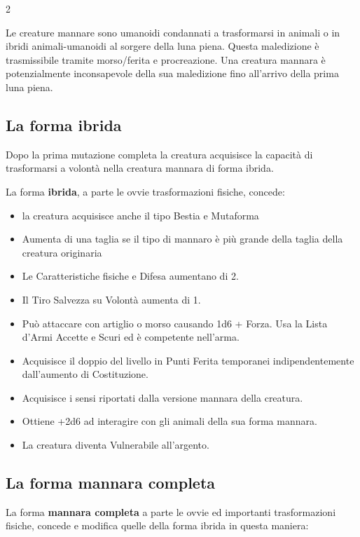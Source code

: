 \begin{multicols}{2}

Le creature mannare sono umanoidi condannati a trasformarsi in animali o in ibridi animali-umanoidi al sorgere della luna piena. Questa maledizione è trasmissibile tramite morso/ferita e procreazione. Una creatura mannara è potenzialmente inconsapevole della sua maledizione fino all'arrivo della prima luna piena.

\subsection{La forma ibrida}

Dopo la prima mutazione completa la creatura acquisisce la capacità di trasformarsi a volontà nella creatura mannara di forma ibrida.

La forma \textbf{ibrida}, a parte le ovvie trasformazioni fisiche, concede:

\begin{itemize}[leftmargin=*] \setlength{\itemsep}{0pt}
	\item la creatura acquisisce anche il tipo Bestia e Mutaforma
	\item Aumenta di una taglia se il tipo di mannaro è più grande della taglia della creatura originaria
	\item Le Caratteristiche fisiche e Difesa aumentano di 2.
	\item Il Tiro Salvezza su Volontà aumenta di 1.
	\item Può attaccare con artiglio o morso causando 1d6 + Forza. Usa la Lista d'Armi Accette e Scuri ed è competente nell'arma.
	\item Acquisisce il doppio del livello in Punti Ferita temporanei indipendentemente dall'aumento di Costituzione.
	\item Acquisisce i sensi riportati dalla versione mannara della creatura.
	\item Ottiene +2d6 ad interagire con gli animali della sua forma mannara.
	\item La creatura diventa Vulnerabile all'argento.
\end{itemize}

\subsection{La forma mannara completa}

La forma \textbf{mannara completa} a parte le ovvie ed importanti trasformazioni fisiche, concede e modifica quelle della forma ibrida in questa maniera:


\end{multicols}
